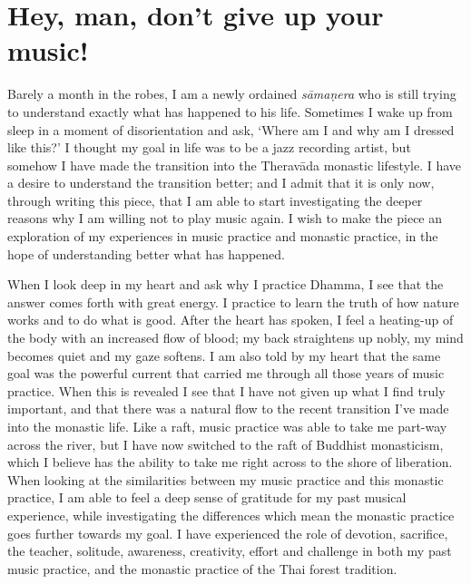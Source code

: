 
\chapter{Hey, man, don't give up your music!}
\markright{\theChapterAuthor}

Barely a month in the robes, I am a newly ordained \emph{sāmaṇera} who
is still trying to understand exactly what has happened to his life. 
Sometimes I wake up from sleep in a moment of disorientation and ask, 
`Where am I and why am I dressed like this?' I thought my goal in life
was to be a jazz recording artist, but somehow I have made the
transition into the Theravāda  monastic lifestyle. I have a desire to
understand the transition better; and I admit that it is only now, 
through writing this piece, that I am able to start investigating the
deeper reasons why I am willing not to play music again. I wish to make
the piece an exploration of my experiences in music practice and
monastic practice, in the hope of understanding better what has
happened. 

When I look deep in my heart and ask why I practice Dhamma, I see that
the answer comes forth with great energy. I practice to learn the truth
of how nature works and to do what is good. After the heart has spoken, 
I feel a heating-up of the body with an increased flow of blood; my back
straightens up nobly, my mind becomes quiet and my gaze softens. I am
also told by my heart that the same goal was the powerful current that
carried me through all those years of music practice. When this is
revealed I see that I have not given up what I find truly important, and
that there was a natural flow to the recent transition I've made into
the monastic life. Like a raft, music practice was able to take me
part-way across the river, but I have now switched to the raft of
Buddhist monasticism, which I believe has the ability to take me right
across to the shore of liberation. When looking at the similarities
between my music practice and this monastic practice, I am able to feel
a deep sense of gratitude for my past musical experience, while
investigating the differences which mean the monastic practice goes
further towards my goal. I have experienced the role of devotion, 
sacrifice, the teacher, solitude, awareness, creativity, effort and
challenge in both my past music practice, and the monastic practice of
the Thai forest tradition. 

